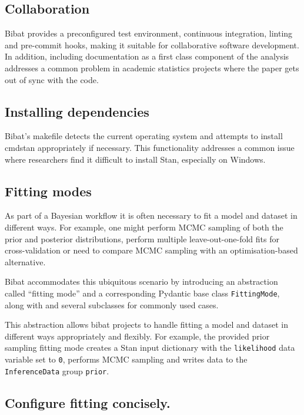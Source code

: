 \documentclass[
  letterpaper,
  DIV=11,
  numbers=noendperiod]{scrartcl}
\begin{document}
\hypertarget{collaboration}{%
\subsection{Collaboration}\label{collaboration}}

Bibat provides a preconfigured test environment, continuous integration,
linting and pre-commit hooks, making it suitable for collaborative
software development. In addition, including documentation as a first
class component of the analysis addresses a common problem in academic
statistics projects where the paper gets out of sync with the code.

\hypertarget{installing-dependencies}{%
\subsection{Installing dependencies}\label{installing-dependencies}}

Bibat's makefile detects the current operating system and attempts to
install cmdstan appropriately if necessary. This functionality addresses
a common issue where researchers find it difficult to install Stan,
especially on Windows.

\hypertarget{fitting-modes}{%
\subsection{Fitting modes}\label{fitting-modes}}

As part of a Bayesian workflow it is often necessary to fit a model and
dataset in different ways. For example, one might perform MCMC sampling
of both the prior and posterior distributions, perform multiple
leave-out-one-fold fits for cross-validation or need to compare MCMC
sampling with an optimisation-based alternative.

Bibat accommodates this ubiquitous scenario by introducing an
abstraction called ``fitting mode'' and a corresponding Pydantic base
class \texttt{FittingMode}, along with and several subclasses for
commonly used cases.

This abstraction allows bibat projects to handle fitting a model and
dataset in different ways appropriately and flexibly. For example, the
provided prior sampling fitting mode creates a Stan input dictionary
with the \texttt{likelihood} data variable set to \texttt{0}, performs
MCMC sampling and writes data to the \texttt{InferenceData} group
\texttt{prior}.

\hypertarget{configure-fitting-concisely.}{%
\subsection{Configure fitting
concisely.}\label{configure-fitting-concisely.}}
\end{document}
